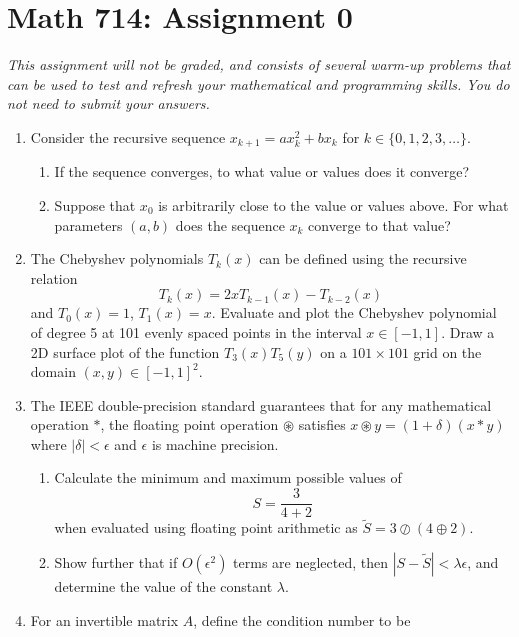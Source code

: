 \documentclass[12pt]{article}
\begin{document}
\section*{Math 714: Assignment 0}
\textit{This assignment will not be graded, and consists of several warm-up
problems that can be used to test and refresh your mathematical and programming
skills. You do not need to submit your answers.}

\begin{enumerate}
  \item Consider the recursive sequence $x_{k+1} = a x_k^2 + bx_k$ for
    $k\in\{0,1,2,3,\ldots\}$.
    \begin{enumerate}
      \item If the sequence converges, to what value or values does it converge?
      \item Suppose that $x_0$ is arbitrarily close to the value or values above.
        For what parameters $(a,b)$ does the sequence $x_k$ converge to that value?
    \end{enumerate}  
  \item The Chebyshev polynomials $T_k(x)$ can be defined using the recursive relation
    \[
    T_k(x) = 2xT_{k-1}(x) - T_{k-2} (x)
    \]
    and $T_0(x)=1$, $T_1(x)=x$. Evaluate and plot the Chebyshev polynomial of
    degree 5 at 101 evenly spaced points in the interval $x\in [-1,1]$. Draw a
    2D surface plot of the function $T_3(x)T_5(y)$ on a $101\times 101$ grid on
    the domain $(x,y) \in [-1,1]^2$.
  \item The IEEE double-precision standard guarantees that for any mathematical
    operation $\ast$, the floating point operation $\circledast$ satisfies
    $x\circledast y = (1+\delta) (x \ast y)$ where $|\delta|<\epsilon$ and
    $\epsilon$ is machine precision.
    \begin{enumerate}
      \item Calculate the minimum and maximum possible values of
        \begin{equation}
          S=\frac{3}{4+2}
        \end{equation}
        when evaluated using floating point arithmetic as $\tilde{S}=3 \oslash
        (4 \oplus 2)$.
      \item Show further that if $O(\epsilon^2)$ terms are neglected, then
        $|S-\tilde{S}|<\lambda \epsilon$, and determine the value of the
        constant $\lambda$.
    \end{enumerate}
  \item For an invertible matrix $A$, define the condition number to be

\end{enumerate}
\end{document}
